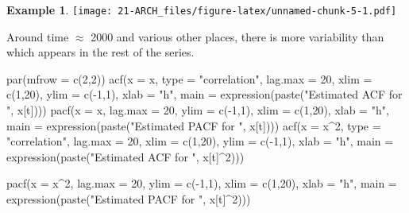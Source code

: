 \documentclass[
]{book}
\newenvironment{Shaded}{\begin{snugshade}}{\end{snugshade}}
\newcommand{\AttributeTok}[1]{\textcolor[rgb]{0.77,0.63,0.00}{#1}}
\newcommand{\DecValTok}[1]{\textcolor[rgb]{0.00,0.00,0.81}{#1}}
\newcommand{\FunctionTok}[1]{\textcolor[rgb]{0.00,0.00,0.00}{#1}}
\newcommand{\NormalTok}[1]{#1}
\newcommand{\SpecialCharTok}[1]{\textcolor[rgb]{0.00,0.00,0.00}{#1}}
\newcommand{\StringTok}[1]{\textcolor[rgb]{0.31,0.60,0.02}{#1}}
\theoremstyle{definition}
\theoremstyle{definition}
\newtheorem{example}{Example}[chapter]
\theoremstyle{definition}
\theoremstyle{definition}
\theoremstyle{remark}
\begin{document}
\begin{example}
\texttt{[image: 21-ARCH\_files/figure-latex/unnamed-chunk-5-1.pdf]}

Around time \(\approx\) 2000 and various other places, there is more variability than which appears in the rest of the series.

\begin{Shaded}
\begin{Highlighting}[]
\FunctionTok{par}\NormalTok{(}\AttributeTok{mfrow =} \FunctionTok{c}\NormalTok{(}\DecValTok{2}\NormalTok{,}\DecValTok{2}\NormalTok{))}
\FunctionTok{acf}\NormalTok{(}\AttributeTok{x =}\NormalTok{ x, }\AttributeTok{type =} \StringTok{"correlation"}\NormalTok{, }\AttributeTok{lag.max =} \DecValTok{20}\NormalTok{, }\AttributeTok{xlim =} \FunctionTok{c}\NormalTok{(}\DecValTok{1}\NormalTok{,}\DecValTok{20}\NormalTok{), }\AttributeTok{ylim =} \FunctionTok{c}\NormalTok{(}\SpecialCharTok{{-}}\DecValTok{1}\NormalTok{,}\DecValTok{1}\NormalTok{), }\AttributeTok{xlab =} \StringTok{"h"}\NormalTok{,}
     \AttributeTok{main =} \FunctionTok{expression}\NormalTok{(}\FunctionTok{paste}\NormalTok{(}\StringTok{"Estimated ACF for "}\NormalTok{, x[t])))}
\FunctionTok{pacf}\NormalTok{(}\AttributeTok{x =}\NormalTok{ x, }\AttributeTok{lag.max =} \DecValTok{20}\NormalTok{, }\AttributeTok{ylim =} \FunctionTok{c}\NormalTok{(}\SpecialCharTok{{-}}\DecValTok{1}\NormalTok{,}\DecValTok{1}\NormalTok{), }\AttributeTok{xlim =} \FunctionTok{c}\NormalTok{(}\DecValTok{1}\NormalTok{,}\DecValTok{20}\NormalTok{), }\AttributeTok{xlab =} \StringTok{"h"}\NormalTok{,}
  \AttributeTok{main =} \FunctionTok{expression}\NormalTok{(}\FunctionTok{paste}\NormalTok{(}\StringTok{"Estimated PACF for "}\NormalTok{, x[t])))}
\FunctionTok{acf}\NormalTok{(}\AttributeTok{x =}\NormalTok{ x}\SpecialCharTok{\^{}}\DecValTok{2}\NormalTok{, }\AttributeTok{type =} \StringTok{"correlation"}\NormalTok{, }\AttributeTok{lag.max =} \DecValTok{20}\NormalTok{, }\AttributeTok{xlim =} \FunctionTok{c}\NormalTok{(}\DecValTok{1}\NormalTok{,}\DecValTok{20}\NormalTok{), }\AttributeTok{ylim =} \FunctionTok{c}\NormalTok{(}\SpecialCharTok{{-}}\DecValTok{1}\NormalTok{,}\DecValTok{1}\NormalTok{), }\AttributeTok{xlab =} \StringTok{"h"}\NormalTok{,}
     \AttributeTok{main =} \FunctionTok{expression}\NormalTok{(}\FunctionTok{paste}\NormalTok{(}\StringTok{"Estimated ACF for "}\NormalTok{, x[t]}\SpecialCharTok{\^{}}\DecValTok{2}\NormalTok{)))}
     
\FunctionTok{pacf}\NormalTok{(}\AttributeTok{x =}\NormalTok{ x}\SpecialCharTok{\^{}}\DecValTok{2}\NormalTok{, }\AttributeTok{lag.max =} \DecValTok{20}\NormalTok{, }\AttributeTok{ylim =} \FunctionTok{c}\NormalTok{(}\SpecialCharTok{{-}}\DecValTok{1}\NormalTok{,}\DecValTok{1}\NormalTok{), }\AttributeTok{xlim =} \FunctionTok{c}\NormalTok{(}\DecValTok{1}\NormalTok{,}\DecValTok{20}\NormalTok{), }\AttributeTok{xlab =} \StringTok{"h"}\NormalTok{,}
\AttributeTok{main =} \FunctionTok{expression}\NormalTok{(}\FunctionTok{paste}\NormalTok{(}\StringTok{"Estimated PACF for "}\NormalTok{, x[t]}\SpecialCharTok{\^{}}\DecValTok{2}\NormalTok{)))}
\end{Highlighting}
\end{Shaded}


\end{example}
\end{document}
